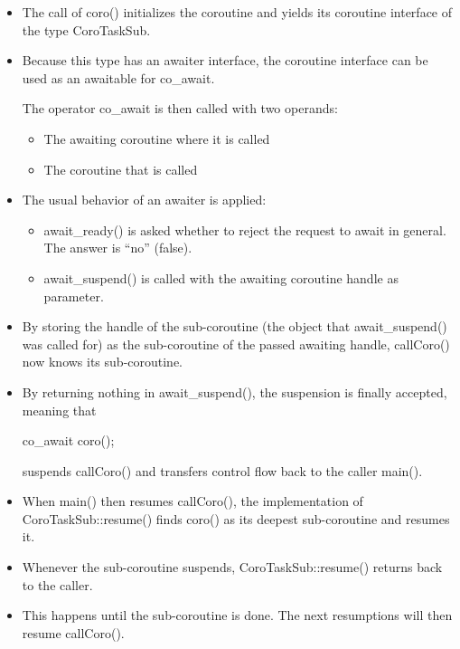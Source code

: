 \begin{itemize}
\item 
The call of coro() initializes the coroutine and yields its coroutine interface of the type CoroTaskSub.

\item 
Because this type has an awaiter interface, the coroutine interface can be used as an awaitable for co\_await.

The operator co\_await is then called with two operands:

\begin{itemize}
\item 
The awaiting coroutine where it is called

\item 
The coroutine that is called
\end{itemize}

\item 
The usual behavior of an awaiter is applied:

\begin{itemize}
\item 
await\_ready() is asked whether to reject the request to await in general. The answer is “no” (false).

\item 
await\_suspend() is called with the awaiting coroutine handle as parameter.
\end{itemize}

\item 
By storing the handle of the sub-coroutine (the object that await\_suspend() was called for) as the sub-coroutine of the passed awaiting handle, callCoro() now knows its sub-coroutine.

\item 
By returning nothing in await\_suspend(), the suspension is finally accepted, meaning that
 
\begin{cpp}
co_await coro();
\end{cpp}

suspends callCoro() and transfers control flow back to the caller main().
 
\item 
When main() then resumes callCoro(), the implementation of CoroTaskSub::resume() finds coro() as its deepest sub-coroutine and resumes it.
 
\item 
Whenever the sub-coroutine suspends, CoroTaskSub::resume() returns back to the caller.

\item 
This happens until the sub-coroutine is done. The next resumptions will then resume callCoro().
\end{itemize}

